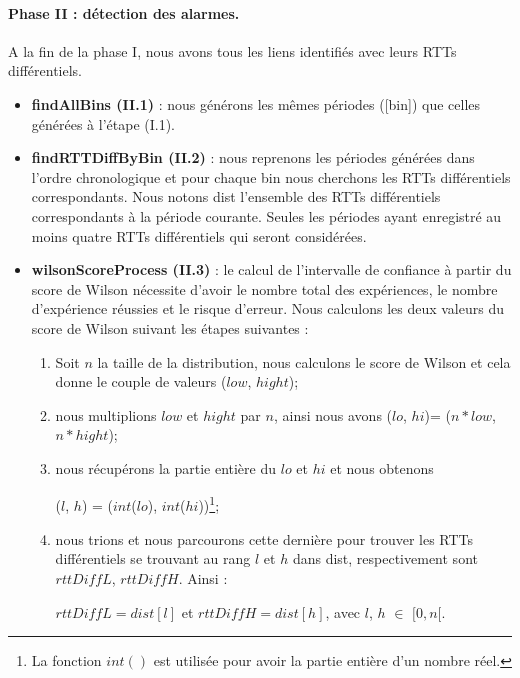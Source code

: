 \paragraph{ Phase II : détection des alarmes.}

 A la fin de la phase I, nous avons tous les liens identifiés avec leurs
 RTTs différentiels. 
 
 \begin{itemize}

 \item \textbf{ findAllBins (II.1)} : nous générons les mêmes périodes  ({\color{gray}[bin]}) que celles générées à
 l'étape (I.1).
 \item \textbf{ findRTTDiffByBin (II.2)} : nous reprenons les périodes générées dans l'ordre chronologique et
 pour chaque {\color{gray}bin} nous cherchons les RTTs différentiels correspondants. Nous
 notons  {\color{gray}dist} l'ensemble des RTTs différentiels correspondants à la période courante.
 Seules les périodes ayant enregistré au moins  quatre RTTs différentiels qui  seront considérées.
\item \textbf{ wilsonScoreProcess (II.3)} : le calcul de l'intervalle de confiance à partir du score de Wilson nécessite d'avoir le nombre total des expériences, le nombre d'expérience réussies et  le risque d'erreur. Nous calculons les deux valeurs du score de Wilson suivant les étapes suivantes :

\begin{enumerate}
	\item Soit $n$ la taille de la distribution, nous calculons le score de Wilson et cela donne le couple de valeurs ($ low $, $ hight $);
	\item nous multiplions $ low $ et $ hight $ par  $n$, ainsi nous avons ($ lo $, $ hi $)=  ($ n*low $, $ n*hight $);
	\item nous récupérons la partie entière du  $ lo $ et $ hi $ et  nous obtenons
	
	 ($l$, $h$) = ($ int $($ lo $), $ int $($ hi $))\footnote{La fonction $  int() $ est utilisée pour avoir la partie entière d'un nombre réel.};
	\item  nous trions  {\color{gray}{dist}}  et nous parcourons cette dernière pour trouver les RTTs différentiels  se trouvant au rang $  l $ et $ h $ dans {\color{gray}dist}, respectivement sont $ rttDiffL $, $ rttDiffH $. Ainsi :
	
	 $ rttDiffL  = dist[l]$  et $ rttDiffH = dist[h]$, avec $l$, $h$ $\in$ $[0,n[$. 
	

\end{enumerate}
\end{itemize}
